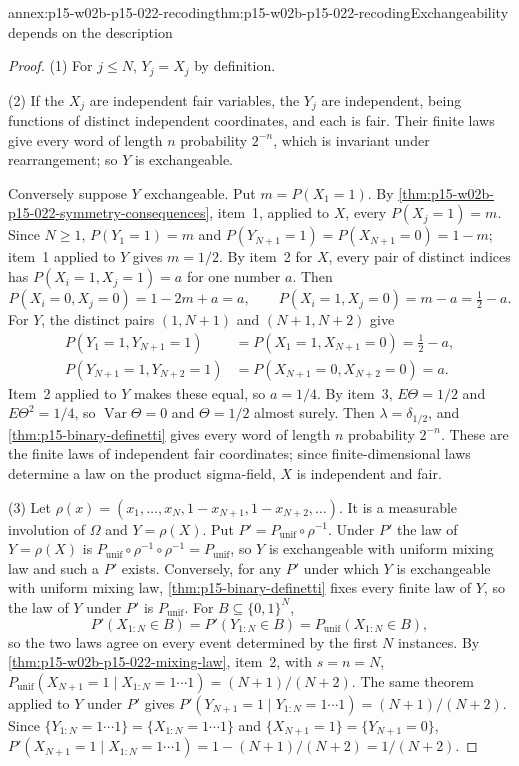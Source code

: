 \begin{annexitem}{annex:p15-w02b-p15-022-recoding}{thm:p15-w02b-p15-022-recoding}{Exchangeability depends on the description}
\begin{proof}
(1) For \(j\leq N\), \(Y_j=X_j\) by definition.

(2) If the \(X_j\) are independent fair variables, the \(Y_j\) are
independent, being functions of distinct independent coordinates, and each
is fair. Their finite laws give every word of length \(n\) probability
\(2^{-n}\), which is invariant under rearrangement; so \(Y\) is
exchangeable.

Conversely suppose \(Y\) exchangeable. Put \(m=P(X_1=1)\). By
\cref{thm:p15-w02b-p15-022-symmetry-consequences}, item~1, applied to
\(X\), every \(P(X_j=1)=m\). Since \(N\geq1\), \(P(Y_1=1)=m\) and
\(P(Y_{N+1}=1)=P(X_{N+1}=0)=1-m\); item~1 applied to \(Y\) gives
\(m=1/2\). By item~2 for \(X\), every pair of distinct indices has
\(P(X_i=1,X_j=1)=a\) for one number \(a\). Then
\[
 P(X_i=0,X_j=0)=1-2m+a=a,\qquad P(X_i=1,X_j=0)=m-a=\tfrac12-a .
\]
For \(Y\), the distinct pairs \((1,N+1)\) and \((N+1,N+2)\) give
\[
 \begin{aligned}
 P(Y_1=1,Y_{N+1}=1)&=P(X_1=1,X_{N+1}=0)=\tfrac12-a,\\
 P(Y_{N+1}=1,Y_{N+2}=1)&=P(X_{N+1}=0,X_{N+2}=0)=a .
 \end{aligned}
\]
Item~2 applied to \(Y\) makes these equal, so \(a=1/4\). By item~3,
\(E\Theta=1/2\) and \(E\Theta^2=1/4\), so
\(\operatorname{Var}\Theta=0\) and \(\Theta=1/2\) almost surely. Then
\(\lambda=\delta_{1/2}\), and \cref{thm:p15-binary-definetti} gives every
word of length \(n\) probability \(2^{-n}\). These are the finite laws of
independent fair coordinates; since finite-dimensional laws determine a law
on the product sigma-field, \(X\) is independent and fair.

(3) Let \(\rho(x)=(x_1,\ldots,x_N,1-x_{N+1},1-x_{N+2},\ldots)\). It is a
measurable involution of \(\Omega\) and \(Y=\rho(X)\). Put
\(P'=P_{\mathrm{unif}}\circ\rho^{-1}\). Under \(P'\) the law of
\(Y=\rho(X)\) is \(P_{\mathrm{unif}}\circ\rho^{-1}\circ\rho^{-1}=P_{\mathrm{unif}}\),
so \(Y\) is exchangeable with uniform mixing law and such a \(P'\) exists.
Conversely, for any \(P'\) under which \(Y\) is exchangeable with uniform
mixing law, \cref{thm:p15-binary-definetti} fixes every finite law of \(Y\),
so the law of \(Y\) under \(P'\) is \(P_{\mathrm{unif}}\). For
\(B\subseteq\{0,1\}^N\),
\[
 P'(X_{1:N}\in B)=P'(Y_{1:N}\in B)=P_{\mathrm{unif}}(X_{1:N}\in B),
\]
so the two laws agree on every event determined by the first \(N\)
instances. By \cref{thm:p15-w02b-p15-022-mixing-law}, item~2, with
\(s=n=N\), \(P_{\mathrm{unif}}(X_{N+1}=1\mid X_{1:N}=1\cdots1)=(N+1)/(N+2)\).
The same theorem applied to \(Y\) under \(P'\) gives
\(P'(Y_{N+1}=1\mid Y_{1:N}=1\cdots1)=(N+1)/(N+2)\). Since
\(\{Y_{1:N}=1\cdots1\}=\{X_{1:N}=1\cdots1\}\) and
\(\{X_{N+1}=1\}=\{Y_{N+1}=0\}\),
\(P'(X_{N+1}=1\mid X_{1:N}=1\cdots1)=1-(N+1)/(N+2)=1/(N+2)\).
\end{proof}
\end{annexitem}

